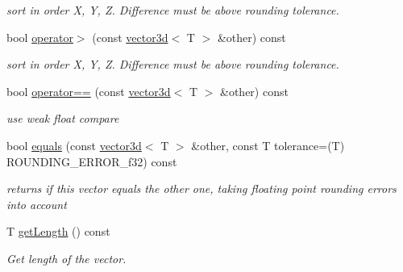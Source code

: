 \begin{DoxyCompactItemize}
\begin{DoxyCompactList}\small\item\em sort in order X, Y, Z. Difference must be above rounding tolerance. \end{DoxyCompactList}\item 
\mbox{\label{classirr_1_1core_1_1vector3d_adbbef0f4f396dc128c694631df71e18a}} 
bool \hyperlink{classirr_1_1core_1_1vector3d_adbbef0f4f396dc128c694631df71e18a}{operator$>$} (const \hyperlink{classirr_1_1core_1_1vector3d}{vector3d}$<$ T $>$ \&other) const
\begin{DoxyCompactList}\small\item\em sort in order X, Y, Z. Difference must be above rounding tolerance. \end{DoxyCompactList}\item 
\mbox{\label{classirr_1_1core_1_1vector3d_afd6ef83df8148b84a2220abb4847972f}} 
bool \hyperlink{classirr_1_1core_1_1vector3d_afd6ef83df8148b84a2220abb4847972f}{operator==} (const \hyperlink{classirr_1_1core_1_1vector3d}{vector3d}$<$ T $>$ \&other) const
\begin{DoxyCompactList}\small\item\em use weak float compare \end{DoxyCompactList}\item 
\mbox{\label{classirr_1_1core_1_1vector3d_a5d0853fe269182d76502724566db429e}} 
bool \hyperlink{classirr_1_1core_1_1vector3d_a5d0853fe269182d76502724566db429e}{equals} (const \hyperlink{classirr_1_1core_1_1vector3d}{vector3d}$<$ T $>$ \&other, const T tolerance=(T) R\+O\+U\+N\+D\+I\+N\+G\+\_\+\+E\+R\+R\+O\+R\+\_\+f32) const
\begin{DoxyCompactList}\small\item\em returns if this vector equals the other one, taking floating point rounding errors into account \end{DoxyCompactList}\item 
\mbox{\label{classirr_1_1core_1_1vector3d_a7f1d3aec798edf0b2c34594c7260ad0e}} 
T \hyperlink{classirr_1_1core_1_1vector3d_a7f1d3aec798edf0b2c34594c7260ad0e}{get\+Length} () const
\begin{DoxyCompactList}\small\item\em Get length of the vector. \end{DoxyCompactList}\item 

\end{DoxyCompactItemize}
